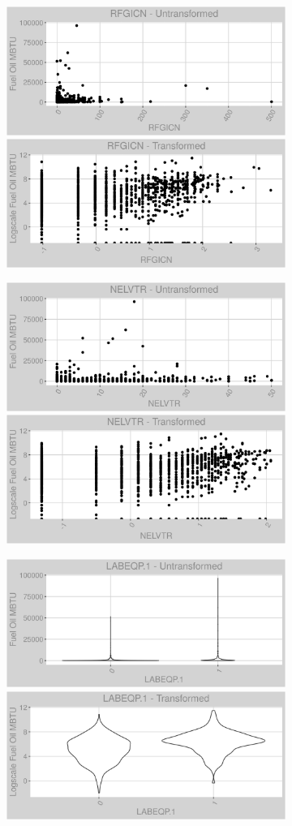 \FloatBarrier
\newpage
\begin{figure}
\centering
\begin{subfigure}{1\textwidth}
\includegraphics[width=.49\textwidth, height=0.3\textheight]{Images/fuel_oil_var_original_12.png}
\includegraphics[width=.49\textwidth, height=0.3\textheight]{Images/fuel_oil_var_transformed_12.png}
\end{subfigure}
\begin{subfigure}{1\textwidth}
\centering
\includegraphics[width=.49\textwidth, height=0.3\textheight]{Images/fuel_oil_var_original_13.png}
\includegraphics[width=.49\textwidth, height=0.3\textheight]{Images/fuel_oil_var_transformed_13.png}
\end{subfigure}
\begin{subfigure}{1\textwidth}
\centering
\includegraphics[width=.49\textwidth, height=0.3\textheight]{Images/fuel_oil_var_original_14.png}
\includegraphics[width=.49\textwidth, height=0.3\textheight]{Images/fuel_oil_var_transformed_14.png}
\end{subfigure}
\end{figure}
